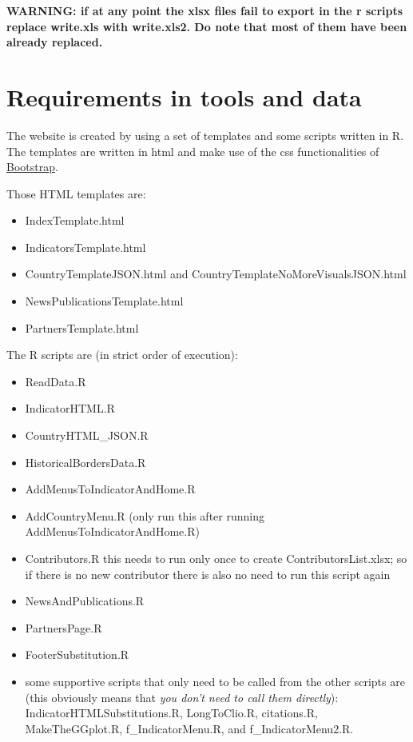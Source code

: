 \documentclass[a4paper]{article}
\begin{document}
\textbf{WARNING: if at any point the xlsx files fail to export in the r scripts 
replace write.xls with write.xls2. Do note that most of them have been already 
replaced.}

\clearpage

\section{Requirements in tools and data}\label{sec:req}

The website is created by using a set of templates and some scripts written in 
R. The templates are written in html and make use of the css functionalities of 
\href{http://getbootstrap.com/}{Bootstrap}. 

Those HTML templates are:
\begin{itemize}
 \item IndexTemplate.html
 \item IndicatorsTemplate.html
 \item CountryTemplateJSON.html and CountryTemplateNoMoreVisualsJSON.html
 \item NewsPublicationsTemplate.html
 \item PartnersTemplate.html
\end{itemize}

The R scripts are (in strict order of execution):
\begin{itemize}
 \item ReadData.R
 \item IndicatorHTML.R
 \item CountryHTML\_JSON.R
 \item HistoricalBordersData.R
 \item AddMenusToIndicatorAndHome.R
 \item AddCountryMenu.R (only run this after running 
AddMenusToIndicatorAndHome.R)
 \item Contributors.R this needs to run only once to create 
ContributorsList.xlsx; so if there is no new contributor there is also no need 
to run this script again
 \item NewsAndPublications.R
 \item PartnersPage.R
 \item FooterSubstitution.R
 \item some supportive scripts that only need to be called from the other 
scripts are (this obviously means that \textit{you don't need to call them 
directly}): IndicatorHTMLSubstitutions.R, LongToClio.R, citations.R, 
MakeTheGGplot.R, f\_IndicatorMenu.R, and f\_IndicatorMenu2.R.
\end{itemize}
\end{document}
